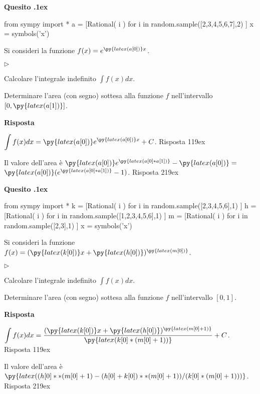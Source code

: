 \documentclass[11pt,twoside,a4paper]{article}
\newcommand{\mylabel}[1]{#1\hfill}
\renewenvironment{itemize}
  {\begin{list}{$\triangleright$}{%
   \setlength{\parskip}{0mm}
   \setlength{\topsep}{.4\baselineskip}
   \setlength{\rightmargin}{0mm}
   \setlength{\listparindent}{0mm}
   \setlength{\itemindent}{0mm}
   \setlength{\labelwidth}{2ex}
   \setlength{\itemsep}{.4\baselineskip}
   \setlength{\parsep}{0mm}
   \setlength{\partopsep}{0mm}
   \setlength{\labelsep}{1ex}
   \setlength{\leftmargin}{\labelwidth+\labelsep}
   \let\makelabel\mylabel}}{%
   \end{list}\vspace*{-1.3mm}}
\newcounter{quesito}
\newenvironment{question}{\bigskip\addtocounter{quesito}{1}\bigskip\bigskip\par\textbf{Quesito \thequesito.\kern1ex}}{\vspace{\parskip}}
\newenvironment{answer}{\par\textbf{Risposta\quad}}{\vspace{\parskip}}
\begin{document}
\begin{question}
\begin{pycode}
from sympy import *
a = [Rational( i ) for i in random.sample([2,3,4,5,6,7],2) ]
x = symbols('x')
\end{pycode}
Si consideri la funzione $f(x) = e^{\py{latex(a[0])}x}$.
\begin{itemize}
\item[1.] Calcolare l'integrale indefinito $\displaystyle \int f(x) dx$.
\item[2.] Determinare l'area (con segno) sottesa alla funzione $f$ nell'intervallo $[0,\py{latex(a[1])}]$.
\end{itemize}
\begin{answer}

{\color{blue}
$\displaystyle \int f(x) dx = \py{latex(a[0])}e^{\py{latex(a[0])}x} + C$.
\hfill Risposta 1\kern19ex}

\smallskip
{\color{blue} Il valore dell'area è} $\py{latex(a[0])}e^{\py{latex(a[0]*a[1])}} - \py{latex(a[0])}=$ {\color{blue}$\py{latex(a[0])}(e^{\py{latex(a[0]*a[1])}}-1)$.
\hfill Risposta 2\kern19ex}

\end{answer}
\end{question}
\begin{question}
\begin{pycode}
from sympy import *
k = [Rational( i ) for i in random.sample([2,3,4,5,6],1) ]
h = [Rational( i ) for i in random.sample([1,2,3,4,5,6],1) ]
m = [Rational( i ) for i in random.sample([2,3],1) ]
x = symbols('x')
\end{pycode}
Si consideri la funzione $f(x) = (\py{latex(k[0])}x+\py{latex(h[0])})^{\py{latex(m[0])}}$.
\begin{itemize}
\item[1.] Calcolare l'integrale indefinito $\displaystyle \int f(x) dx$.
\item[2.] Determinare l'area (con segno) sottesa alla funzione $f$ nell'intervallo $[0,1]$.
\end{itemize}
\begin{answer}

{\color{blue}
$\displaystyle \int f(x) dx = \frac{(\py{latex(k[0])}x+\py{latex(h[0])})^{\py{latex(m[0]+1)}}}{\py{latex(k[0]*(m[0]+1))}} + C$.
\hfill Risposta 1\kern19ex}

\smallskip
{\color{blue} Il valore dell'area è $\py{latex((h[0]**(m[0]+1)-(h[0]+k[0])**(m[0]+1))/(k[0]*(m[0]+1)))}$.
\hfill Risposta 2\kern19ex}

\end{answer}
\end{question}
\end{document}
